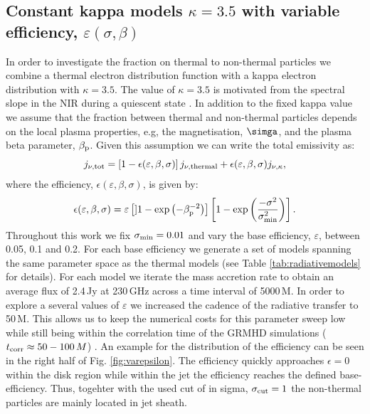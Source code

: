 \subsection{Constant kappa models $\kappa=3.5$ with variable efficiency, $\varepsilon(\sigma,\beta)$}
In order to investigate the fraction on thermal to non-thermal particles we combine a thermal electron distribution function with a kappa electron distribution with $\kappa=3.5$. The value of $\kappa=3.5$ is motivated from the spectral slope in the NIR during a quiescent state . In addition to the fixed kappa value we assume that the fraction between thermal and non-thermal particles depends on the local plasma properties, e.g, the magnetisation, $\simga$, and the plasma beta parameter, $\beta_{\rm p}$. Given this assumption we can write the total emissivity as:
\begin{equation}
j_{\nu,\rm{tot}}=\left[1-\epsilon(\varepsilon,\beta, \sigma)\right] j_{\nu,\rm{thermal}} + \epsilon(\varepsilon,\beta, \sigma) j_{\nu, \kappa},
\end{equation}
where the efficiency, $\epsilon(\varepsilon,\beta,\sigma)$, is given by:
\begin{equation}
    \epsilon(\varepsilon,\beta,\sigma)=\varepsilon\left[] 1 - \exp\left(-\beta_{\rm p}^{-2}\right)\right]\left[1-\exp\left(\frac{-\sigma^2}{\sigma_{\rm min}^2}\right)\right].
\end{equation}
Throughout this work we fix $\sigma_{\rm min}=0.01$ and vary the base efficiency, $\varepsilon$, between 0.05, 0.1 and 0.2. For each base efficiency we generate a set of models spanning the same parameter space as the thermal models (see Table \ref{tab:radiativemodels} for details). For each model we iterate the mass accretion rate to obtain an average flux of 2.4\,Jy at 230\,GHz across a time interval of 5000\,M. In order to explore a several values of $\varepsilon$ we increased the cadence of the radiative transfer to 50\,M. This allows us to keep the numerical costs for this parameter sweep low while still being within the correlation time of the GRMHD simulations ($t_{\rm corr}\approx 50-100\,M$) . An example for the distribution of the efficiency can be seen in the right half of  Fig. \ref{fig:varepsilon}. The efficiency quickly approaches $\epsilon=0$ within the disk region while within the jet the efficiency reaches the defined base-efficiency. Thus, togehter with the used cut of in sigma, $\sigma_{\rm cut}=1$ the non-thermal particles are mainly located in jet sheath.

